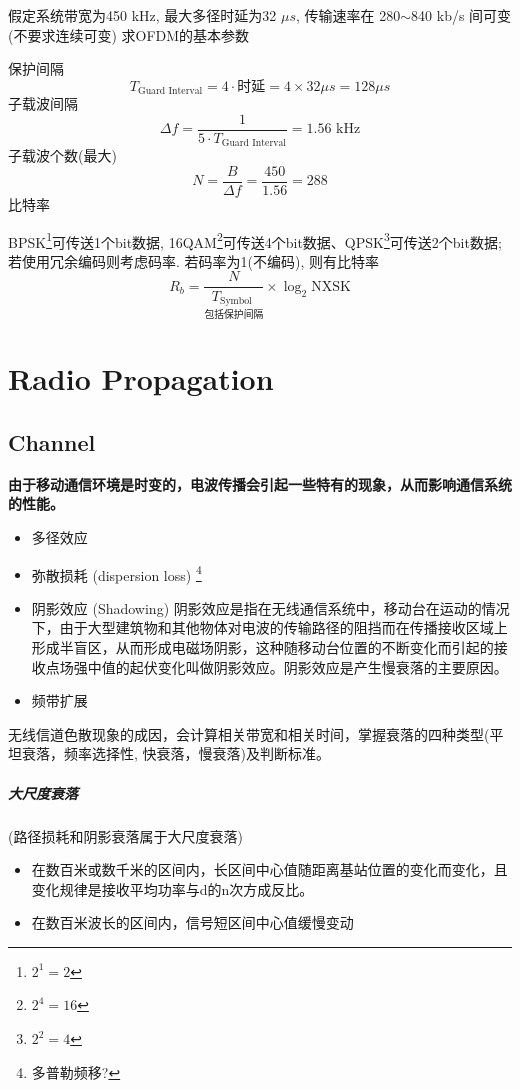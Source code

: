 \documentclass[a4paper]{report}
\begin{document}
假定系统带宽为450 kHz, 最大多径时延为32 $\mu s$, 传输速率在 280$\sim$840 kb/s 间可变 (不要求连续可变) 求OFDM的基本参数

保护间隔
\begin{equation}
	T_{\text{Guard Interval}} =4\cdot \text{时延}= 4\times 32 \mu s= 128 \mu s 
\end{equation}
子载波间隔
\begin{equation}
	\Delta f = \frac{1}{5\cdot T_{\text{Guard Interval}}}=1.56\text{ kHz} 
\end{equation}
子载波个数(最大)
\begin{equation}
	N=\frac{B}{\Delta f}=\frac{450}{1.56}=288
\end{equation}
比特率

BPSK\footnote{$2^1=2$}可传送1个bit数据, 16QAM\footnote{$2^4=16$}可传送4个bit数据、QPSK\footnote{$2^2=4$}可传送2个bit数据; 若使用冗余编码则考虑码率. 若码率为1(不编码), 则有比特率
\begin{equation}
	R_b=\frac{N}{\underset{\text{包括保护间隔}}{T_{\text{Symbol }}}}\times \log_2{\text{NXSK}}
\end{equation}

\chapter{Radio Propagation}
 \section{Channel}
\textbf{由于移动通信环境是时变的，电波传播会引起一些特有的现象，从而影响通信系统的性能。}
\begin{itemize}
	\item 多径效应
	\item 弥散损耗 (dispersion loss) \footnote{多普勒频移?}
	\item 阴影效应 (Shadowing)
	\subitem 阴影效应是指在无线通信系统中，移动台在运动的情况下，由于大型建筑物和其他物体对电波的传输路径的阻挡而在传播接收区域上形成半盲区，从而形成电磁场阴影，这种随移动台位置的不断变化而引起的接收点场强中值的起伏变化叫做阴影效应。阴影效应是产生慢衰落的主要原因。
	\item 频带扩展
\end{itemize}

 无线信道色散现象的成因，会计算相关带宽和相关时间，掌握衰落的四种类型(平坦衰落，频率选择性, 快衰落，慢衰落)及判断标准。


 \paragraph{大尺度衰落} (路径损耗和阴影衰落属于大尺度衰落)
 \begin{itemize}
	\item 在数百米或数千米的区间内，长区间中心值随距离基站位置的变化而变化，且变化规律是接收平均功率与d的n次方成反比。
	\item 在数百米波长的区间内，信号短区间中心值缓慢变动
 \end{itemize}
\end{document}
